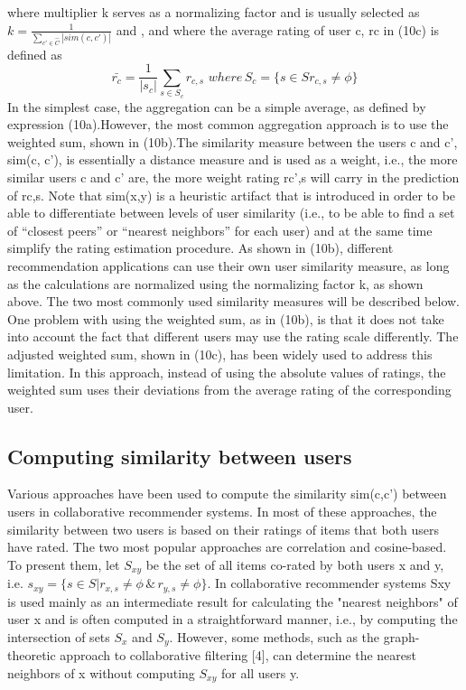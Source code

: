 where multiplier k serves as a normalizing factor and is usually selected as $k = \frac{1}{\sum_{c' \in \hat{C}} |sim(c,c')|}$ and , and where the average rating of user c, rc in (10c) is defined as
\begin{equation}\label{eq:11}
\bar{r_c}=\frac{1}{|s_c|}\sum _{s\in S_c} r_{c,s} \,\, where \,S_c = \{s\in S r_{c,s} \neq \phi\}
\end{equation}
In the simplest case, the aggregation can be a simple average, as defined by expression (10a).However, the most common aggregation approach is to use the weighted sum, shown in (10b).The similarity measure between the users c and c’, sim(c, c’), is essentially a distance measure and is used as a weight, i.e., the more similar users c and c’ are, the more weight rating rc’,s will carry in the prediction of rc,s. Note that sim(x,y) is a heuristic artifact that is introduced in order to be able to differentiate between levels of user similarity (i.e., to be able to find a set of “closest peers” or “nearest neighbors” for each user) and at the same time simplify the rating estimation procedure. As shown in (10b), different recommendation applications can use their own user similarity measure, as long as the calculations are normalized using the normalizing factor k, as shown above. The two most commonly used similarity measures will be described below. One problem with using the weighted sum, as in (10b), is that it does not take into account the fact that different users may use the rating scale differently. The adjusted weighted sum, shown in (10c), has been widely used to address this limitation. In this approach, instead of using the absolute values of ratings, the weighted sum uses their deviations from the average rating of the corresponding user.


\subsection{Computing similarity between users}
Various approaches have been used to compute the similarity sim(c,c') between users in collaborative recommender systems. In most of these approaches, the similarity between two users is based on their ratings of items that both users have rated. The two most popular approaches are correlation and cosine-based. To present them, let $S_{xy}$ be the set of all items co-rated by both users x and y, i.e. $s_{xy}=\{s\in S|r_{x,s}\neq \phi\, \&\, r_{y,s} \neq \phi \}$. In collaborative recommender systems Sxy is used mainly as an intermediate result for calculating the "nearest neighbors" of user x and is often computed in a straightforward manner, i.e., by computing the intersection of sets $S_x$ and $S_y$. However, some methods, such as the graph-theoretic approach to collaborative filtering [4], can determine the nearest neighbors of x without computing $S_{xy}$ for all users y.

